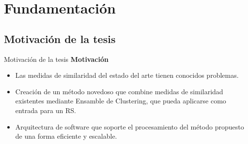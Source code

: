 \section{Fundamentación}

\subsection{Motivación de la tesis}
\begin{frame}{Motivación de la tesis}
	\textbf{Motivación}
	\bigskip
	\begin{itemize} [<+>]
		\item Las medidas de similaridad del estado del arte tienen conocidos problemas.
		\item Creación de un método novedoso que combine medidas de similaridad existentes mediante Ensamble de Clustering, que pueda aplicarse como entrada para un RS.
		\item Arquitectura de software que soporte el procesamiento del método propuesto de una forma eficiente y escalable.
	\end{itemize}
\end{frame}